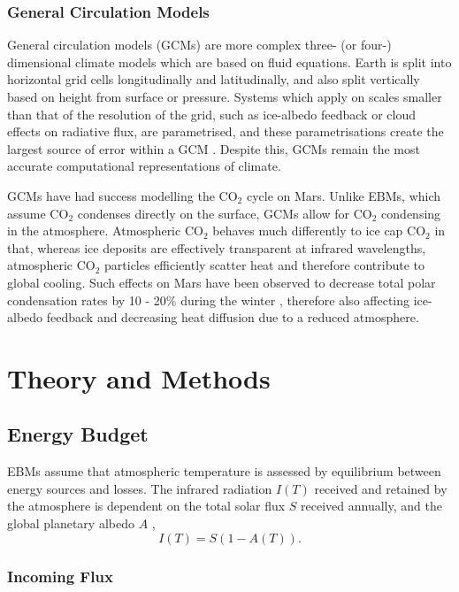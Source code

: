 \documentclass[12pt,onecolumn]{revtex4-2}    %
\begin{document}
\subsubsection{General Circulation Models}

General circulation models (GCMs) are more complex three- (or four-) dimensional climate models which are based on fluid equations. Earth is split into horizontal grid cells longitudinally and latitudinally, and also split vertically based on height from surface or pressure. Systems which apply on scales smaller than that of the resolution of the grid, such as ice-albedo feedback or cloud effects on radiative flux, are parametrised, and these parametrisations create the largest source of error within a GCM \cite{CBZH}. Despite this, GCMs remain the most accurate computational representations of climate.
\

GCMs have had success modelling the $\mathrm{CO_2}$ cycle on Mars. Unlike EBMs, which assume $\mathrm{CO_2}$ condenses directly on the surface, GCMs allow for $\mathrm{CO_2}$ condensing in the atmosphere. Atmospheric $\mathrm{CO_2}$ behaves much differently to ice cap $\mathrm{CO_2}$ in that, whereas ice deposits are effectively transparent at infrared wavelengths, atmospheric $\mathrm{CO_2}$ particles efficiently scatter heat and therefore contribute to global cooling. Such effects on Mars have been observed to decrease total polar condensation rates by 10 - 20\% during the winter \cite{FP96}, therefore also affecting ice-albedo feedback and decreasing heat diffusion due to a reduced atmosphere. 
 
\section{Theory and Methods} 
\subsection{Energy Budget}

EBMs assume that atmospheric temperature is assessed by equilibrium between energy sources and losses. The infrared radiation $I(T)$ received and retained by the atmosphere is dependent on the total solar flux $S$ received annually, and the global planetary albedo $A$ ,
\begin{equation}
I(T) = S(1-A(T)).
\end{equation}
\subsubsection{Incoming Flux}
\end{document}
